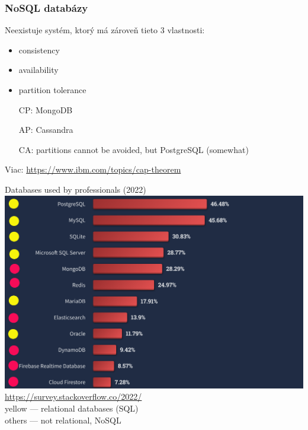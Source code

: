 \documentclass[12pt]{beamer}
\begin{document}
\begin{frame}
\frametitle{NoSQL databázy}
\begin{theorem}
Neexistuje systém, ktorý má zároveň tieto 3 vlastnosti:
\begin{itemize}
\item consistency
\item availability
\item partition tolerance
\end{itemize}
\end{theorem}
\begin{itemize}
\item[CP:] MongoDB
\item[AP:] Cassandra
\item[CA:] partitions cannot be avoided, but PostgreSQL (somewhat)
\end{itemize}
{\scriptsize Viac: \url{https://www.ibm.com/topics/cap-theorem}}
\end{frame}


\begin{frame}{Databases used by professionals (2022)}
\includegraphics[scale=.15]{commondb_modified.png}\\
{\tiny \url{https://survey.stackoverflow.co/2022/}}\\[3mm]
{\small yellow --- relational databases (SQL)}\\
{\small others --- not relational, NoSQL}
\end{frame}
\end{document}
